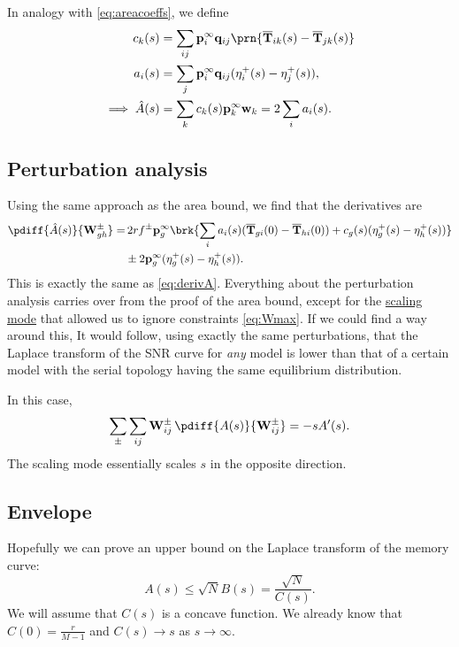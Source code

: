 \documentclass[12pt]{article}
\newcommand{\eq}{\mathbf{p}^\infty}
\newcommand{\fpt}{\mathbf{T}}
\newcommand{\fptb}{\overline{\fpt}}
\newcommand{\w}{\mathbf{w}}
\newcommand{\W}{\mathbf{W}}
\newcommand{\enc}{\mathbf{q}}
\begin{document}
In analogy with \eqref{eq:areacoeffs}, we define
%
\begin{equation}\label{eq:lareacoeffs}
  \begin{aligned}
    c_k(s) &= \sum_{ij} \eq_i \enc_{ij} \prn{\fptb_{ik}(s)-\fptb_{jk}(s)} \\
    a_i(s) &= \sum_j \eq_i \enc_{ij} (\eta^+_{i}(s) - \eta^+_{j}(s)),\\
    \implies
    \hat{A}(s) &= \sum_k c_k(s) \eq_k \w_k
      = 2\sum_i a_i(s).
  \end{aligned}
\end{equation}
%

\subsection{Perturbation analysis}\label{sec:lpert}

Using the same approach as the area bound, we find that the derivatives are
%
\begin{equation}\label{eq:lAdiff}
\begin{aligned}
  \pdiff{\hat{A}(s)}{\W^\pm_{gh}}
     =&\, 2rf^\pm \eq_g \brk{ \sum_i a_i(s) (\fptb_{gi}(0)-\fptb_{hi}(0))
     +c_g(s) (\eta^+_g(s) - \eta^+_h(s)) } \\
     &\pm 2\eq_g (\eta^+_g(s) - \eta^+_h(s)).
\end{aligned}
\end{equation}
%
This is exactly the same as \eqref{eq:derivA}.
Everything about the perturbation analysis carries over from the proof of the area bound, except for the \hyperref[sec:rescale]{scaling mode} that allowed us to ignore constraints \eqref{eq:Wmax}.
If we could find a way around this, It would follow, using exactly the same perturbations, that the Laplace transform of the SNR curve for \emph{any} model is lower than that of a certain model with the serial topology having the same equilibrium distribution.

In this case,
%
\begin{equation}\label{eq:scaleLaplace}
  \sum_\pm\sum_{ij} \W^\pm_{ij} \, \pdiff{A(s)}{\W^\pm_{ij}} = -s A'(s).
\end{equation}
%
The scaling mode essentially scales $s$ in the opposite direction.


\subsection{Envelope}\label{sec:env}

Hopefully we can prove an upper bound on the Laplace transform of the memory curve:
%
\begin{equation}\label{eq:lbound}
  A(s) \leq \sqrt{N}B(s) = \frac{\sqrt{N}}{C(s)}.
\end{equation}
%
We will assume that $C(s)$ is a concave function.
We already know that $C(0)=\frac{r}{M-1}$ and $C(s) \to s$ as $s\to\infty$.
\end{document}
